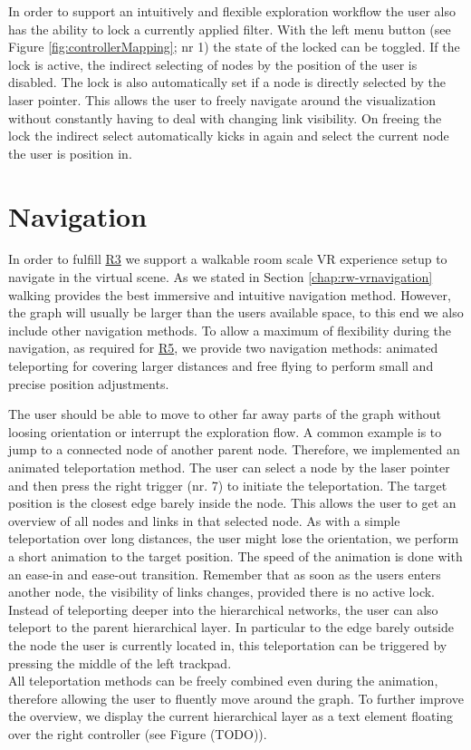 In order to support an intuitively and flexible exploration workflow the user also has the ability to lock a currently applied filter.
With the left menu button (see Figure \ref{fig:controllerMapping}; nr 1) the state of the locked can be toggled. 
If the lock is active, the indirect selecting of nodes by the position of the user is disabled. The lock is also automatically set if a node is directly selected by the laser pointer. 
This allows the user to freely navigate around the visualization without constantly having to deal with changing link visibility. 
On freeing the lock the indirect select automatically kicks in again and select the current node the user is position in.

\section{Navigation}
\label{chap:solution-navigation}
In order to fulfill \hyperref[req:R3]{R3} we support a walkable room scale VR experience setup to navigate in the virtual scene. As we stated in Section \ref{chap:rw-vrnavigation} walking provides the best immersive and intuitive navigation method.
However, the graph will usually be larger than the users available space, to this end we also include other navigation methods.
To allow a maximum of flexibility during the navigation, as required for \hyperref[req:R5]{R5}, we provide two navigation methods: animated teleporting for covering larger distances and free flying to perform small and precise position adjustments.

The user should be able to move to other far away parts of the graph without loosing orientation or interrupt the exploration flow. A common example is to jump to a connected node of another parent node. 
Therefore, we implemented an animated teleportation method. The user can select a node by the laser pointer and then press the right trigger (nr. 7) to initiate the teleportation. The target position is the closest edge barely inside the node. This allows the user to get an overview of all nodes and links in that selected node.   
As with a simple teleportation over long distances, the user might lose the orientation, we perform a short animation to the target position. The speed of the animation is done with an ease-in and ease-out transition.
Remember that as soon as the users enters another node, the visibility of links changes, provided there is no active lock.\\
Instead of teleporting deeper into the hierarchical networks, the user can also teleport to the parent hierarchical layer. In particular to the edge barely outside the node the user is currently located in, this teleportation can be triggered by pressing the middle of the left trackpad.\\
All teleportation methods can be freely combined even during the animation, therefore allowing the user to fluently move around the graph. 
To further improve the overview, we display the current hierarchical layer as a text element floating over the right controller (see Figure (TODO)). 


